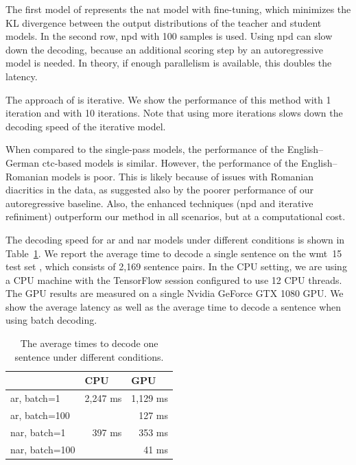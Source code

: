 The first model of \citet{gu2017nonautoregressive} represents the \ac{nat}
model with fine-tuning, which minimizes the KL divergence between the output
distributions of the teacher and student models. In the second row, \ac{npd}
with 100 samples is used.  Using
\ac{npd} can slow down the decoding, because an additional scoring step by an
autoregressive model is needed. In theory, if enough parallelism is available,
this doubles the latency.

The approach of \citet{lee-etal-2018-deterministic} is iterative. We show the
performance of this method with 1 iteration and with 10 iterations. Note that
using more iterations slows down the decoding speed of the iterative model.

When compared to the single-pass models, the performance of the English--German
\acs{ctc}-based models is similar. However, the performance of the
English--Romanian models is poor. This is likely because of issues with
Romanian diacritics in the data, as suggested also by the poorer performance of
our autoregressive baseline. Also, the enhanced techniques (\ac{npd} and
iterative refiniment) outperform our method in all scenarios, but at a
computational cost.

The decoding speed for \ac{ar} and {nar} models under different conditions is
shown in Table~\ref{tab:end-to-end:speed}. We report the average time to decode
a single sentence on the \ac{wmt}~15 test set \citep{bojar-etal-2015-findings},
which consists of 2,169 sentence pairs. In the CPU setting, we are using a CPU
machine with the TensorFlow session configured to use 12 CPU threads. The GPU
results are measured on a single Nvidia GeForce GTX 1080 GPU. We show the
average latency as well as the average time to decode a sentence when using
batch decoding.

\begin{table}
  \centering

  \begin{tabular}{lrr}
    \toprule
     & \multicolumn{1}{l}{CPU} & \multicolumn{1}{l}{GPU} \\
    \midrule
    \acs{ar}, batch=1 & 2,247 ms & 1,129 ms \\
    \acs{ar}, batch=100 & & 127 ms\\
    \addlinespace
    \acs{nar}, batch=1 & 397 ms & 353 ms  \\
    \acs{nar}, batch=100 &  & 41 ms \\
    \bottomrule
  \end{tabular}

  \caption{The average times to decode one sentence under different conditions.}%
  \label{tab:end-to-end:speed}

\end{table}

